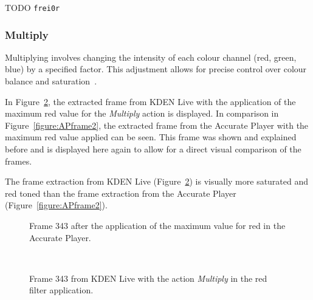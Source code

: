 \documentclass[../MasterThesis.tex]{subfiles}
\begin{document}
TODO \texttt{frei0r}




\subsubsection*{Multiply}

Multiplying involves changing the intensity of each colour channel (red, green, blue) by a specified factor. This adjustment allows for precise control over colour balance and saturation~\cite{gimp}.

In Figure~\ref{figure:multiply}, the extracted frame from KDEN Live with the application of the maximum red value for the \textit{Multiply} action is displayed. 
In comparison in Figure~\ref{figure:APframe2}, the extracted frame from the Accurate Player with the maximum red value applied can be seen. This frame was shown and explained before and is displayed here again to allow for a direct visual comparison of the frames.

The frame extraction from KDEN Live (Figure~\ref{figure:multiply}) is visually more saturated and red toned than the frame extraction from the Accurate Player (Figure~\ref{figure:APframe2}).


\begin{minipage}{0.48\textwidth}
	\begin{figure}[H]
		\begin{center}
			\caption[Frame 343 after the application of the red filter in the Accurate Player.]{Frame 343 after the application of the maximum value for red in the Accurate Player.}
			\label{figure:APframe3}
		\end{center}
	\end{figure}
\end{minipage}\begin{minipage}{0.04\textwidth}
	\ 
\end{minipage}\begin{minipage}{0.48\textwidth}
	\begin{figure}[H]
		\begin{center}
			\caption[Frame 343 from KDEN Live with the action \textit{Multiply}.]{Frame 343 from KDEN Live with the action \textit{Multiply} in the red filter application.}
			\label{figure:multiply}
		\end{center}
	\end{figure}
\end{minipage}
\vspace*{1em}
\end{document}
